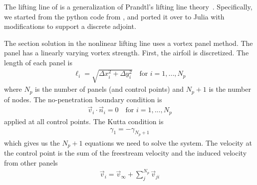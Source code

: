 \documentclass[10pt]{article}
\newcommand{\beq}{\begin{equation}\begin{aligned}}
\newcommand{\eeq}{\end{aligned}\end{equation}}
\newcommand{\tn}[1]{\textrm{#1}}
\begin{document}
The lifting line of \citet{Phillips2000} is a generalization of Prandtl's lifting line theory~\cite{Prandtl1918a}.
Specifically, we started from the python code from \citet{Reid2021}, and ported it over to Julia with modifications to support a discrete adjoint.

The section solution in the nonlinear lifting line uses a vortex panel method.
The panel has a linearly varying vortex strength.
First, the airfoil is discretized.
The length of each panel is
\beq
\ell_i = \sqrt{\Delta x_i^2 + \Delta y_i^2}
\quad \tn{for }i=1, ..., N_p
\eeq
where $N_p$ is the number of panels (and control points) and $N_p+1$ is the number of nodes.
The no-penetration boundary condition is
\beq
\vec{v}_{i}\cdot \vec{n}_i = 0
\quad \tn{for } i=1,...,N_p
\eeq
applied at all control points.
The Kutta condition is
\beq
\gamma_1 = -\gamma_{N_p+1}
\eeq
which gives us the $N_p+1$ equations we need to solve the system.
The velocity at the control point is the sum of the freestream velocity and the induced velocity from other panels
\beq
\vec{v}_i = \vec{v}_\infty + \sum_j^{N_p} \vec{v}_{ji}
\eeq
\end{document}
